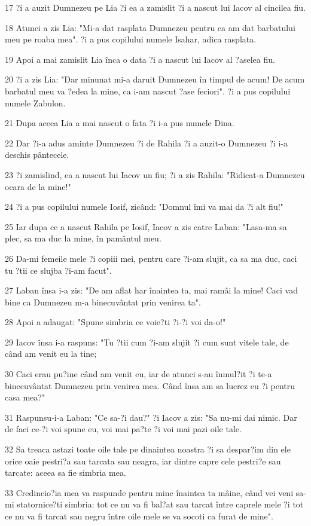 \par 17 ?i a auzit Dumnezeu pe Lia ?i ea a zamislit ?i a nascut lui Iacov al cincilea fiu.
\par 18 Atunci a zis Lia: "Mi-a dat rasplata Dumnezeu pentru ca am dat barbatului meu pe roaba mea". ?i a pus copilului numele Isahar, adica rasplata.
\par 19 Apoi a mai zamislit Lia înca o data ?i a nascut lui Iacov al ?aselea fiu.
\par 20 ?i a zis Lia: "Dar minunat mi-a daruit Dumnezeu în timpul de acum! De acum barbatul meu va ?edea la mine, ca i-am nascut ?ase feciori". ?i a pus copilului numele Zabulon.
\par 21 Dupa aceea Lia a mai nascut o fata ?i i-a pus numele Dina.
\par 22 Dar ?i-a adus aminte Dumnezeu ?i de Rahila ?i a auzit-o Dumnezeu ?i i-a deschis pântecele.
\par 23 ?i zamislind, ea a nascut lui Iacov un fiu; ?i a zis Rahila: "Ridicat-a Dumnezeu ocara de la mine!"
\par 24 ?i a pus copilului numele Iosif, zicând: "Domnul îmi va mai da ?i alt fiu!"
\par 25 Iar dupa ce a nascut Rahila pe Iosif, Iacov a zis catre Laban: "Lasa-ma sa plec, sa ma duc la mine, în pamântul meu.
\par 26 Da-mi femeile mele ?i copiii mei, pentru care ?i-am slujit, ca sa ma duc, caci tu ?tii ce slujba ?i-am facut".
\par 27 Laban însa i-a zis: "De am aflat har înaintea ta, mai ramâi la mine! Caci vad bine ca Dumnezeu m-a binecuvântat prin venirea ta".
\par 28 Apoi a adaugat: "Spune simbria ce voie?ti ?i-?i voi da-o!"
\par 29 Iacov însa i-a raspuns: "Tu ?tii cum ?i-am slujit ?i cum sunt vitele tale, de când am venit eu la tine;
\par 30 Caci erau pu?ine când am venit eu, iar de atunci s-au înmul?it ?i te-a binecuvântat Dumnezeu prin venirea mea. Când însa am sa lucrez eu ?i pentru casa mea?"
\par 31 Raspunsu-i-a Laban: "Ce sa-?i dau?" ?i Iacov a zis: "Sa nu-mi dai nimic. Dar de faci ce-?i voi spune eu, voi mai pa?te ?i voi mai pazi oile tale.
\par 32 Sa treaca astazi toate oile tale pe dinaintea noastra ?i sa despar?im din ele orice oaie pestri?a sau tarcata sau neagra, iar dintre capre cele pestri?e sau tarcate: aceea sa fie simbria mea.
\par 33 Credincio?ia mea va raspunde pentru mine înaintea ta mâine, când vei veni sa-mi statornice?ti simbria: tot ce nu va fi bal?at sau tarcat între caprele mele ?i tot ce nu va fi tarcat sau negru între oile mele se va socoti ca furat de mine".
